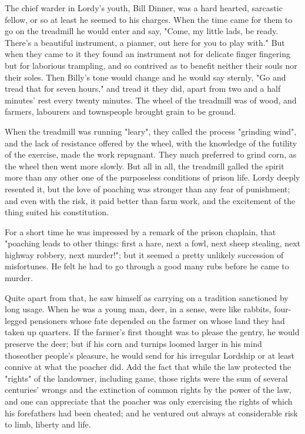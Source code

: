 The chief warder in Lordy's youth, Bill Dinner, was a hard hearted, sarcastic fellow, or so at least he seemed to his charges. When the time came for them to go on the treadmill he would enter and say, "Come, my little lads, be ready. There's a beautiful instrument, a pianner, out here for you to play with." But when they came to it they found an instrument not for delicate finger fingering but for laborious trampling, and so contrived as to benefit neither their souls nor their soles. Then Billy's tone would change and he would say sternly, "Go and tread that for seven hours," and tread it they did, apart from two and a half minutes' rest every twenty minutes. The wheel of the treadmill was of wood, and farmers, labourers and townspeople brought grain to be ground.

When the treadmill was running "leary", they called the process "grinding wind", and the lack of resistance offered by the wheel, with the knowledge of the futility of the exercise, made the work repugnant. They much preferred to grind corn, as the wheel then went more slowly. But all in all, the treadmill galled the spirit more than any other one of the purposeless conditions of prison life. Lordy deeply resented it, but the love of poaching was stronger than any fear of punishment; and even with the risk, it paid better than farm work, and the excitement of the thing suited his constitution.

For a short time he was impressed by a remark of the prison chaplain, that "poaching leads to other things: first a hare, next a fowl, next sheep stealing, next highway robbery, next murder!"; but it seemed a pretty unlikely succession of misfortunes. He felt he had to go through a good many rubs before he came to murder.

Quite apart from that, he saw himself as carrying on a tradition sanctioned by long usage. When he was a young man, deer, in a sense, were like rabbits, four-legged pensioners whose fate depended on the farmer on whose land they had taken up quarters. If the farmer's first thought was to please the gentry, he would preserve the deer; but if his corn and turnips loomed larger in his mind thoseother people's pleasure, he would send for his irregular Lordship or at least connive at what the poacher did. Add the fact that while the law protected the "rights" of the landowner, including game, those rights were the sum of several centuries' wrongs and the extinction of common rights by the power of the law, and one can appreciate that the poacher was only exercising the rights of which his forefathers had been cheated; and he ventured out always at considerable risk to limb, liberty and life.

